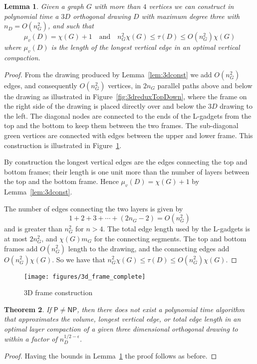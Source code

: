 \documentclass[12pt]{article}
\newtheorem{theorem}{Theorem}
\newtheorem{lemma}[theorem]{Lemma}
\theoremstyle{definitions}
\renewcommand{\P}{\mathsf{P}}
\newcommand{\NP}{\mathsf{NP}}
\begin{document}
\begin{lemma}
\label{lem:3dframe}
Given a graph $G$ with more than $4$ vertices we can construct in polynomial time a $3D$ orthogonal drawing $D$ with maximum degree three with $n_D = O(n_G^2)$, and such that
\[
\mu_v(D) = \chi(G) + 1 \quad\text{and}\quad n_G^2 \chi(G) \leq \tau(D) \leq O(n_G^2) \chi(G)
\]
where $\mu_v(D)$ is the length of the longest vertical edge in an optimal vertical compaction.
\end{lemma}
\begin{proof}
From the drawing produced by Lemma~\ref{lem:3dconst} we add $O(n_G^2)$ edges, and consequently $O(n_G^2)$ vertices, in $2n_G$ parallel paths above and below the drawing as illustrated in Figure~\ref{fig:3dreduxTopDown}, where the frame on the right side of the drawing is placed directly over and below the $3D$ drawing to the left. The diagonal nodes are connected to the ends of the L-gadgets from the top and the bottom to keep them between the two frames. The sub-diagonal green vertices are connected with edges between the upper and lower frame. This construction is illustrated in Figure~\ref{fig:3dframe}.

By construction the longest vertical edges are the edges connecting the top and bottom frames; their length is one unit more than the number of layers between the top and the bottom frame. Hence $\mu_v(D) = \chi(G) + 1$ by Lemma~\ref{lem:3dconst}.

The number of edges connecting the two layers is given by
\[
1+2+3+\cdots+(2n_G-2) = O(n_G^2)
\]
and is greater than $n_G^2$ for $n > 4$. The total edge length used by the L-gadgets is at most $2n_G^2$, and $\chi(G)m_G$ for the connecting segments. The top and bottom frames add $O(n_G^2)$ length to the drawing, and the connecting edges add $O(n_G^2)\chi(G)$. So we have that $n_G^2 \chi(G) \leq \tau(D) \leq O(n_G^2)\chi(G)$.
\end{proof}

\begin{figure}[b!]
\centering
\texttt{[image: figures/3d\_frame\_complete]}
\caption{3D frame construction
\label{fig:3dframe}}
\end{figure}
\newpage
\begin{theorem}
If $\P \neq \NP$, then there does not exist a polynomial time algorithm that
approximates the volume, longest vertical edge, or total edge length 
in an optimal layer compaction of a given three dimensional orthogonal drawing 
to within a factor of $n_D^{1/2-\epsilon}$.
\end{theorem}
\begin{proof}
Having the bounds in Lemma~\ref{lem:3dframe} the proof follows as before.
\end{proof}
\end{document}
